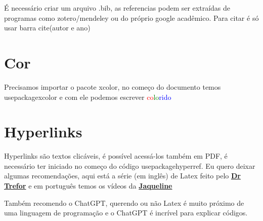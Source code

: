 \documentclass[a4paper]{article}
\begin{document}
É necessário criar um arquivo .bib, as referencias podem ser extraídas de programas como zotero/mendeley ou do próprio google acadêmico. Para citar é só usar barra cite(autor e ano)

\section{Cor}
Precisamos importar o pacote xcolor, no começo do documento temos usepackage{xcolor}
e com ele podemos escrever
\textcolor{red}{co}\textcolor{green}{lo}\textcolor{blue}{rido}
\section{Hyperlinks}
Hyperlinks são textos clicáveis, é possível acessá-los também em PDF, é necessário ter iniciado no começo do código usepackage{hyperref}. Eu quero deixar algumas recomendações, aqui está a série (em inglês) de Latex feito pelo 
\textbf{
\href{https://www.youtube.com/watch?v=xyZtxfMsD38&list=PLHXZ9OQGMqxcWWkx2DMnQmj5os2X5ZR73&index=8}{Dr Trefor}} e em português temos os vídeos da \textbf{\href{https://www.youtube.com/watch?v=zR-QuNf3agQ&list=PLb735fZHArLamJiCIXsQT6BiHM1IgYQ43}{Jaqueline}}

Também recomendo o ChatGPT, querendo ou não Latex é muito próximo de uma linguagem de programação e o ChatGPT é incrível para explicar códigos.




\vspace{50pt}
\end{document}
